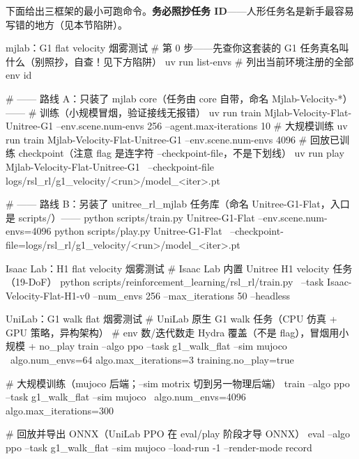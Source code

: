 下面给出三框架的最小可跑命令。\textbf{务必照抄任务 ID}——人形任务名是新手最容易写错的地方（见本节陷阱）。

\begin{codebox}[bash]{mjlab：G1 flat velocity 烟雾测试}
# 第 0 步——先查你这套装的 G1 任务真名叫什么（别照抄，自查！见下方陷阱）
uv run list-envs        # 列出当前环境注册的全部 env id

# —— 路线 A：只装了 mjlab core（任务由 core 自带，命名 Mjlab-Velocity-*）——
# 训练（小规模冒烟，验证接线无报错）
uv run train Mjlab-Velocity-Flat-Unitree-G1 --env.scene.num-envs 256 --agent.max-iterations 10
# 大规模训练
uv run train Mjlab-Velocity-Flat-Unitree-G1 --env.scene.num-envs 4096
# 回放已训练 checkpoint（注意 flag 是连字符 --checkpoint-file，不是下划线）
uv run play Mjlab-Velocity-Flat-Unitree-G1 \
  --checkpoint-file logs/rsl_rl/g1_velocity/<run>/model_<iter>.pt

# —— 路线 B：另装了 unitree_rl_mjlab 任务库（命名 Unitree-G1-Flat，入口是 scripts/）——
python scripts/train.py Unitree-G1-Flat --env.scene.num-envs=4096
python scripts/play.py Unitree-G1-Flat \
  --checkpoint-file=logs/rsl_rl/g1_velocity/<run>/model_<iter>.pt
\end{codebox}

\begin{codebox}[bash]{Isaac Lab：H1 flat velocity 烟雾测试}
# Isaac Lab 内置 Unitree H1 velocity 任务（19-DoF）
python scripts/reinforcement_learning/rsl_rl/train.py \
  --task Isaac-Velocity-Flat-H1-v0 --num_envs 256 --max_iterations 50 --headless
\end{codebox}

\begin{codebox}[bash]{UniLab：G1 walk flat 烟雾测试}
# UniLab 原生 G1 walk 任务（CPU 仿真 + GPU 策略，异构架构）
# env 数/迭代数走 Hydra 覆盖（不是 flag），冒烟用小规模 + no_play
train --algo ppo --task g1_walk_flat --sim mujoco \
    algo.num_envs=64 algo.max_iterations=3 training.no_play=true

# 大规模训练（mujoco 后端；--sim motrix 切到另一物理后端）
train --algo ppo --task g1_walk_flat --sim mujoco \
    algo.num_envs=4096 algo.max_iterations=300

# 回放并导出 ONNX（UniLab PPO 在 eval/play 阶段才导 ONNX）
eval --algo ppo --task g1_walk_flat --sim mujoco --load-run -1 --render-mode record
\end{codebox}



